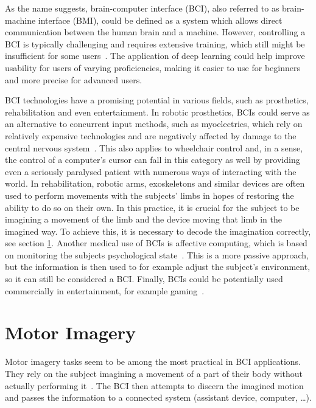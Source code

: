 \documentclass[english, he, bc, kiv, iso690alph, viewonly]{fasthesis}
\begin{document}
As the name suggests, brain-computer interface (BCI), also referred to as brain-machine interface (BMI), could be defined as a system which allows direct communication between the human brain and a machine. However, controlling a BCI is typically challenging and requires extensive training, which still might be insufficient for some users~\cite{data:stieger:21}. The application of deep learning could help improve usability for users of varying proficiencies, making it easier to use for beginners and more precise for advanced users.

BCI technologies have a promising potential in various fields, such as prosthetics, rehabilitation and even entertainment.
In robotic prosthetics, BCIs could serve as an alternative to concurrent input methods, such as myoelectrics, which rely on relatively expensive technologies and are negatively affected by damage to the central nervous system~\cite{padfield:bci:19}. This also applies to wheelchair control and, in a sense, the control of a computer's cursor can fall in this category as well by providing even a seriously paralysed patient with numerous ways of interacting with the world.
In rehabilitation, robotic arms, exoskeletons and similar devices are often used to perform movements with the subjects' limbs in hopes of restoring the ability to do so on their own. In this practice, it is crucial for the subject to be imagining a movement of the limb and the device moving that limb in the imagined way. To achieve this, it is necessary to decode the imagination correctly, see section \ref{sec:mi}.
Another medical use of BCIs is affective computing, which is based on monitoring the subjects psychological state~\cite{padfield:bci:19}. This is a more passive approach, but the information is then used to for example adjust the subject's environment, so it can still be considered a BCI.
Finally, BCIs could be potentially used commercially in entertainment, for example gaming~\cite{padfield:bci:19}.

\section{Motor Imagery}
\label{sec:mi}

Motor imagery tasks seem to be among the most practical in BCI applications.
They rely on the subject imagining a movement of a part of their body without actually performing it~\cite{craik:dl:eeg:rev:19}.
The BCI then attempts to discern the imagined motion and passes the information to a connected system (assistant device, computer, \dots).
\end{document}
